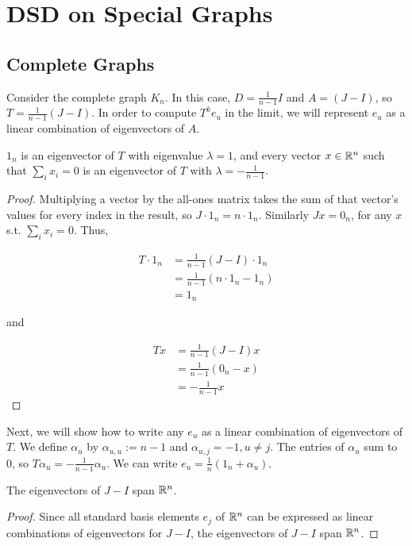 \section{DSD on Special Graphs}

\subsection{Complete Graphs}
Consider the complete graph $K_n$. In this case, $D = \frac{1}{n-1}I$ and
$A = (J - I)$, so $T=\frac{1}{n-1}(J-I)$. In order to compute $T^ke_u$ in the
limit, we will represent $e_u$ as a linear combination of eigenvectors of $A$.

\begin{remark}
  $1_n$ is an eigenvector of $T$ with eigenvalue $\lambda = 1$, and every
  vector $x \in \mathbb{R}^n$ such that $\sum_i x_i = 0$ is an eigenvector of $T$ with
  $\lambda = -\frac{1}{n-1}$.
\end{remark}
\begin{proof}
  Multiplying a vector by the all-ones matrix takes the sum of that vector's
  values for every index in the result, so $J \cdot 1_n = n \cdot 1_n$.
  Similarly $Jx = 0_n$, for any $x$ s.t. $\sum_i x_i = 0$. Thus,

  \begin{align*}
    T\cdot 1_n &= \frac{1}{n-1}(J-I) \cdot 1_n \\
               &= \frac{1}{n-1}(n\cdot 1_n - 1_n) \\
               &= 1_n
  \end{align*}

  and

  \begin{align*}
    Tx &= \frac{1}{n-1}(J-I)x \\
       &= \frac{1}{n-1}(0_n - x) \\
       &= -\frac{1}{n-1}x
  \end{align*}
\end{proof}


Next, we will show how to write any $e_u$ as a linear combination of
eigenvectors of $T$. We define $\alpha_u$ by $\alpha_{u,u} := n-1$ and
$\alpha_{u,j} = -1, u\neq j$. The entries of $\alpha_u$ sum to $0$, so
$T\alpha_u=-\frac{1}{n-1}\alpha_u$. We can write
$e_u = \frac{1}{n}(1_n + \alpha_u)$.

\begin{corollary}
  The eigenvectors of $J-I$ span $\mathbb{R}^n$.
\end{corollary}
\begin{proof}
  Since all standard basis elements $e_j$ of $\mathbb{R}^n$ can be expressed as linear
  combinations of eigenvectors for $J-I$, the eigenvectors of $J-I$ span $\mathbb{R}^n$.
\end{proof}

